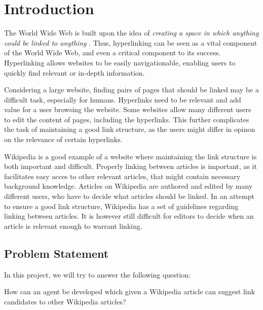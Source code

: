 \chapter{Introduction}
The World Wide Web is built upon the idea of \emph{creating a space in which anything could be linked to anything} \cite[ch.~1, p.~4]{Weaving-the-web}. Thus, hyperlinking can be seen as a vital component of the World Wide Web, and even a critical component to its success. Hyperlinking allows websites to be easily navigationable, enabling users to quickly find relevant or in-depth information.

Considering a large website, finding pairs of pages that should be linked may be a difficult task, especially for humans. Hyperlinks need to be relevant and add value for a user browsing the website. Some websites allow many different users to edit the content of pages, including the hyperlinks. This further complicates the task of maintaining a good link structure, as the users might differ in opinon on the relevance of certain hyperlinks.

Wikipedia is a good example of a website where maintaining the link structure is both important and difficult. Properly linking between articles is important, as it facilitates easy acces to other relevant articles, that might contain necessary background knowledge. Articles on Wikipedia are authored and edited by many different users, who have to decide what articles should be linked. In an attempt to ensure a good link structure, Wikipedia has a set of guidelines regarding linking between articles. It is however still difficult for editors to decide when an article is relevant enough to warrant linking.



\section{Problem Statement}

In this project, we will try to answer the following question:

\begin{formal}
How can an agent be developed which given a Wikipedia article can suggest link candidates to other Wikipedia articles?
\end{formal}


